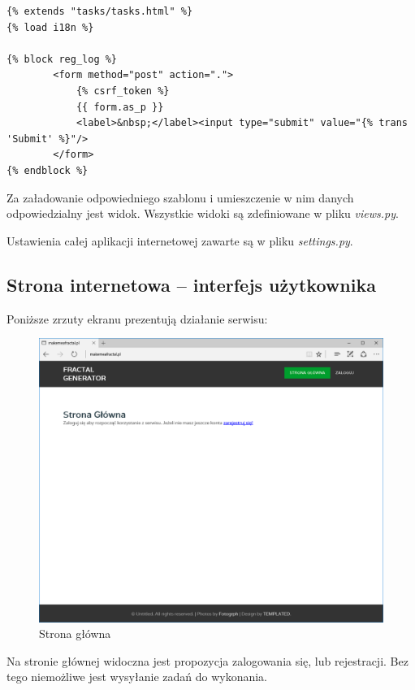 \documentclass[a4paper]{article}
\begin{document}
\begin{lstlisting}
{% extends "tasks/tasks.html" %}
{% load i18n %}

{% block reg_log %}
        <form method="post" action=".">
            {% csrf_token %}
            {{ form.as_p }}
            <label>&nbsp;</label><input type="submit" value="{% trans 'Submit' %}"/>
        </form>
{% endblock %}
\end{lstlisting}

Za załadowanie odpowiedniego szablonu i umieszczenie w nim danych odpowiedzialny jest widok. Wszystkie widoki są zdefiniowane w pliku \textit{views.py}.

Ustawienia całej aplikacji internetowej zawarte są w pliku \textit{settings.py}. 

\subsection{Strona internetowa -- interfejs użytkownika}
Poniższe zrzuty ekranu prezentują działanie serwisu:
 \begin{figure}[H]
    \centering
    \includegraphics[width=\textwidth]{main_page.png}
    \caption{Strona główna}
    \label{fig:main_page}
\end{figure}
Na stronie głównej widoczna jest propozycja zalogowania się, lub rejestracji. Bez tego niemożliwe jest wysyłanie zadań do wykonania. 
\end{document}
